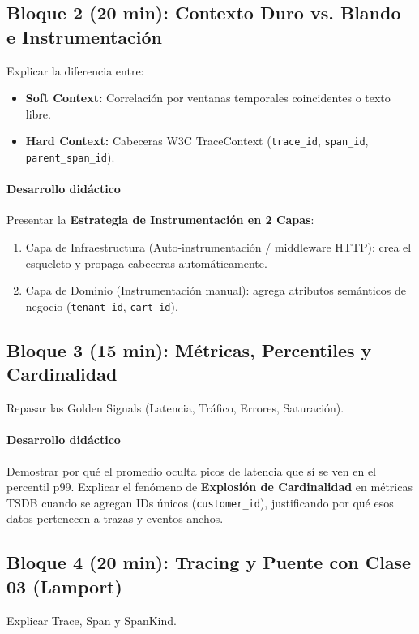 \documentclass[variant=docente,cover=institutional,mode=screen]{ua-engineering-v6-article}
\begin{document}
\subsection*{Bloque 2 (20 min): Contexto Duro vs. Blando e Instrumentación}
Explicar la diferencia entre:
\begin{itemize}
\item \textbf{Soft Context:} Correlación por ventanas temporales coincidentes o texto libre.
\item \textbf{Hard Context:} Cabeceras W3C TraceContext (\texttt{trace\_id}, \texttt{span\_id}, \texttt{parent\_span\_id}).
\end{itemize}

\paragraph{Desarrollo didáctico}
Presentar la \textbf{Estrategia de Instrumentación en 2 Capas}:
\begin{enumerate}
\item Capa de Infraestructura (Auto-instrumentación / middleware HTTP): crea el esqueleto y propaga cabeceras automáticamente.
\item Capa de Dominio (Instrumentación manual): agrega atributos semánticos de negocio (\texttt{tenant\_id}, \texttt{cart\_id}).
\end{enumerate}

\subsection*{Bloque 3 (15 min): Métricas, Percentiles y Cardinalidad}
Repasar las Golden Signals (Latencia, Tráfico, Errores, Saturación).

\paragraph{Desarrollo didáctico}
Demostrar por qué el promedio oculta picos de latencia que sí se ven en el percentil p99. Explicar el fenómeno de \textbf{Explosión de Cardinalidad} en métricas TSDB cuando se agregan IDs únicos (\texttt{customer\_id}), justificando por qué esos datos pertenecen a trazas y eventos anchos.

\subsection*{Bloque 4 (20 min): Tracing y Puente con Clase 03 (Lamport)}
Explicar Trace, Span y SpanKind.
\end{document}
